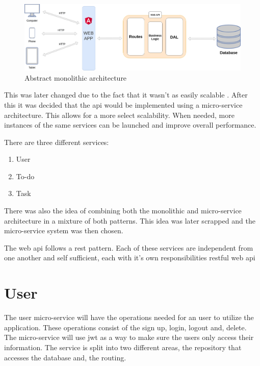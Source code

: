 	\begin{figure}[h!]
		\centering
		\includegraphics[width=\linewidth]{./images/monolithic_abstract_architecture}
		\caption{Abstract monolithic architecture}
	\end{figure}
	
	This was later changed due to the fact that it wasn't as easily scalable \cite{scale}. After this it was decided that the \gls{api} would be implemented using a micro-service\cite{microservice} architecture. This allows for a more select scalability. When needed, more instances of the same services can be launched and improve overall performance.
	
	There are three different services:
	\begin{enumerate}
		\item User
		\item To-do
		\item Task
	\end{enumerate}
	
	There was also the idea of combining both the monolithic and micro-service architecture in a mixture of both patterns. This idea was later scrapped and the micro-service system was then chosen.
	
	The web \gls{api} follows a \gls{rest} pattern\cite{rest}.
	Each of these services are independent from one another and self sufficient, each with it's own responsibilities 
	\gls{rest}ful web \gls{api} 
	
	
	
		\section{User}
		The user micro-service will have the operations needed for an user to utilize the application. These operations consist of the sign up, login, logout and, delete.
		The micro-service will use \gls{jwt} \cite{jwt} as a way to make sure the users only access their information.
		The service is split into two different areas, the repository\cite{repositorypattern} that accesses the database and, the routing.
		
